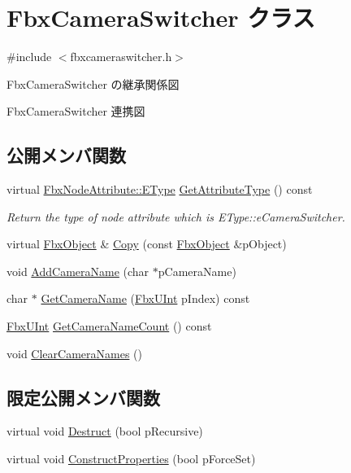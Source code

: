 \hypertarget{class_fbx_camera_switcher}{}\section{Fbx\+Camera\+Switcher クラス}
\label{class_fbx_camera_switcher}


{\ttfamily \#include $<$fbxcameraswitcher.\+h$>$}



Fbx\+Camera\+Switcher の継承関係図


Fbx\+Camera\+Switcher 連携図
\subsection*{公開メンバ関数}
\begin{DoxyCompactItemize}
\item 
virtual \hyperlink{class_fbx_node_attribute_a08e1669d3d1a696910756ab17de56d6a}{Fbx\+Node\+Attribute\+::\+E\+Type} \hyperlink{class_fbx_camera_switcher_ad42aacc90ece1f0295e51db102ae48ad}{Get\+Attribute\+Type} () const
\begin{DoxyCompactList}\small\item\em Return the type of node attribute which is E\+Type\+::e\+Camera\+Switcher. \end{DoxyCompactList}\item 
virtual \hyperlink{class_fbx_object}{Fbx\+Object} \& \hyperlink{class_fbx_camera_switcher_a4f9ed75fe53a90e3bfae94415714fc99}{Copy} (const \hyperlink{class_fbx_object}{Fbx\+Object} \&p\+Object)
\item 
void \hyperlink{class_fbx_camera_switcher_a0b10a6c548f79eb7b3917807429ac8bb}{Add\+Camera\+Name} (char $\ast$p\+Camera\+Name)
\item 
char $\ast$ \hyperlink{class_fbx_camera_switcher_a9cfc17b2e772a32cdbb0f15fffb18eda}{Get\+Camera\+Name} (\hyperlink{fbxtypes_8h_ae9fb141d8158a730aa85ec5ff2ea3f6b}{Fbx\+U\+Int} p\+Index) const
\item 
\hyperlink{fbxtypes_8h_ae9fb141d8158a730aa85ec5ff2ea3f6b}{Fbx\+U\+Int} \hyperlink{class_fbx_camera_switcher_a5311eac98442cb069497ea8b09b3717d}{Get\+Camera\+Name\+Count} () const
\item 
void \hyperlink{class_fbx_camera_switcher_a19e4199ca22422dd83db62938c7f7b55}{Clear\+Camera\+Names} ()
\end{DoxyCompactItemize}
\subsection*{限定公開メンバ関数}
\begin{DoxyCompactItemize}
\item 
virtual void \hyperlink{class_fbx_camera_switcher_aba10821ff1b60cb32a21da2fc55ea711}{Destruct} (bool p\+Recursive)
\item 
virtual void \hyperlink{class_fbx_camera_switcher_a38011053f3a61df4e93989d7c970fa16}{Construct\+Properties} (bool p\+Force\+Set)
\end{DoxyCompactItemize}
